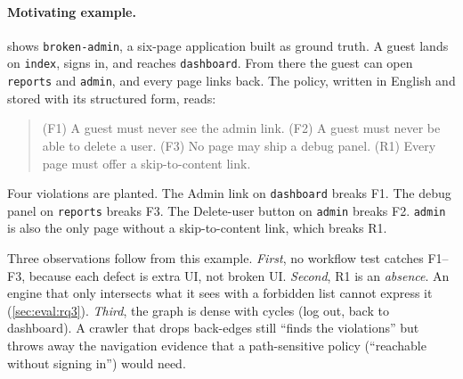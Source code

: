 \paragraph{Motivating example.}
 shows \texttt{broken-admin}, a six-page
application built as ground truth. A guest lands on \texttt{index}, signs in,
and reaches \texttt{dashboard}. From there the guest can open
\texttt{reports} and \texttt{admin}, and every page links back. The policy,
written in English and stored with its structured form, reads:

\begin{quote}\small
(F1) A guest must never see the admin link.
(F2) A guest must never be able to delete a user.
(F3) No page may ship a debug panel.
(R1) Every page must offer a skip-to-content link.
\end{quote}

Four violations are planted. The Admin link on \texttt{dashboard} breaks F1.
The debug panel on \texttt{reports} breaks F3. The Delete-user button on
\texttt{admin} breaks F2. \texttt{admin} is also the only page without a
skip-to-content link, which breaks R1.

Three observations follow from this example. \emph{First}, no workflow test
catches F1--F3, because each defect is extra UI, not broken UI. \emph{Second},
R1 is an \emph{absence}. An engine that only intersects what it sees with a
forbidden list cannot express it (\cref{sec:eval:rq3}). \emph{Third}, the
graph is dense with cycles (log out, back to dashboard). A crawler that drops
back-edges still ``finds the violations'' but throws away the navigation
evidence that a path-sensitive policy (``reachable without signing in'') would
need.

